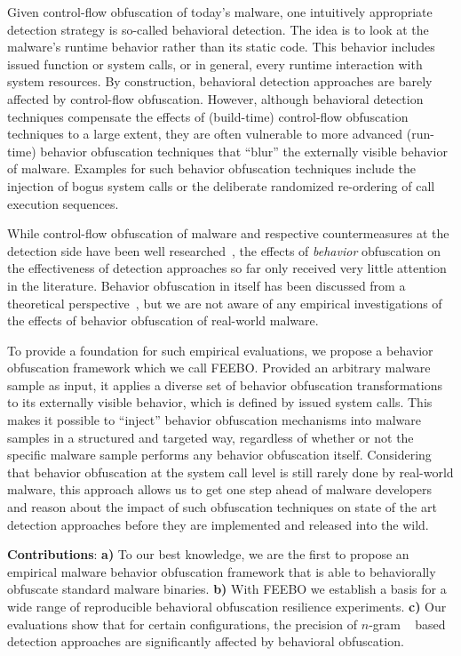 \documentclass{llncs}
\begin{document}
Given control-flow obfuscation of today's malware, one intuitively appropriate detection strategy is so-called behavioral detection. The idea is to look at the malware's runtime behavior rather than its static code. This behavior includes issued function or system calls, or in general, every runtime interaction with system resources. By construction, behavioral detection approaches are barely affected by control-flow obfuscation. However, although behavioral detection techniques compensate the effects of (build-time) control-flow obfuscation techniques to a large extent, they are often vulnerable to more advanced (run-time) behavior obfuscation techniques that ``blur'' the externally visible behavior of malware. Examples for such behavior obfuscation techniques include the injection of bogus system calls or the deliberate randomized re-ordering of call execution sequences.

While control-flow obfuscation of malware and respective 
countermeasures at the detection side have been well 
researched~\cite{Collberg2009}, the effects of 
\emph{behavior} obfuscation on the effectiveness of detection approaches so 
far only received very little attention in the literature. Behavior obfuscation 
in itself has been discussed from a theoretical 
perspective~\cite{dalla2008semantics}, but we are not aware of any empirical investigations of the effects of behavior obfuscation of real-world malware.

To provide a foundation for such empirical evaluations, we propose a behavior obfuscation framework which we call FEEBO. Provided an arbitrary malware sample as input, it applies a diverse set of behavior obfuscation transformations to its externally visible behavior, which is defined by issued system calls. This makes it possible to ``inject'' behavior obfuscation mechanisms into malware samples in a structured and targeted way, regardless of whether or not the specific malware sample performs any behavior obfuscation itself. Considering that behavior obfuscation at the system call level is still rarely done by real-world malware, this approach allows us to get one step ahead of malware developers and reason about the impact of such obfuscation techniques on state of the art detection approaches before they are implemented and released into the wild. 

\textbf{Contributions}: \textbf{a)} To our best knowledge, we are the first to propose an empirical malware behavior obfuscation framework that is able to behaviorally obfuscate standard malware binaries. \textbf{b)} With FEEBO we establish a basis for a wide range of reproducible behavioral obfuscation resilience experiments. \textbf{c)} Our evaluations show that for certain configurations, the precision of $n$-gram ~\cite{wressnegger2013} based detection approaches are significantly affected by behavioral obfuscation.
\end{document}
